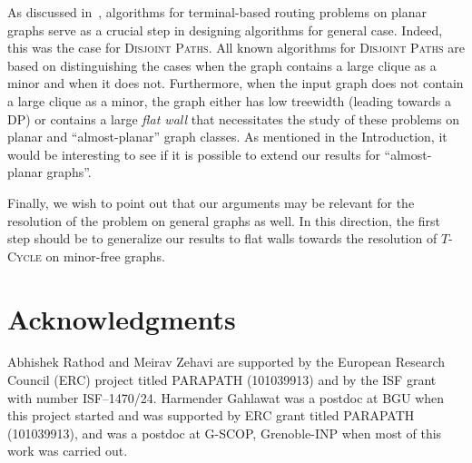 \documentclass{article}
\numberwithin{claimcounter}{lemma}
\newcommand{\tcycle}{$T$-\textsc{Cycle}\xspace}
\begin{document}
As discussed in~\cite{DBLP:conf/birthday/Lokshtanov0Z20}, algorithms for terminal-based routing problems on planar graphs serve as a crucial step in designing algorithms for general case. Indeed, this was the case for \textsc{Disjoint Paths}. All known algorithms for \textsc{Disjoint Paths} are based on distinguishing the cases when the graph contains a large clique as a minor and when it does not. Furthermore, when the input graph does not contain a large clique as a minor, the graph either has  low treewidth (leading towards a DP) or contains a large \textit{flat wall} that necessitates the study of these problems on planar and ``almost-planar'' graph classes.  As mentioned in the Introduction, it would be interesting  to see if it is possible to extend our results for ``almost-planar graphs''. 


Finally, we wish to point out that our arguments may be relevant for the resolution of the problem on general graphs as well. In this direction, the first step should be to generalize our results to flat walls towards the resolution of \tcycle on minor-free graphs. 






\section*{Acknowledgments}
Abhishek Rathod and Meirav Zehavi are supported by the European Research Council (ERC) project titled PARAPATH (101039913) and by the ISF grant with number ISF--1470/24. Harmender Gahlawat was a postdoc at BGU when this project started and was supported by ERC grant titled PARAPATH (101039913), and was a postdoc at G-SCOP, Grenoble-INP when most of this work was carried out.


 






\newpage
\appendix
\end{document}
